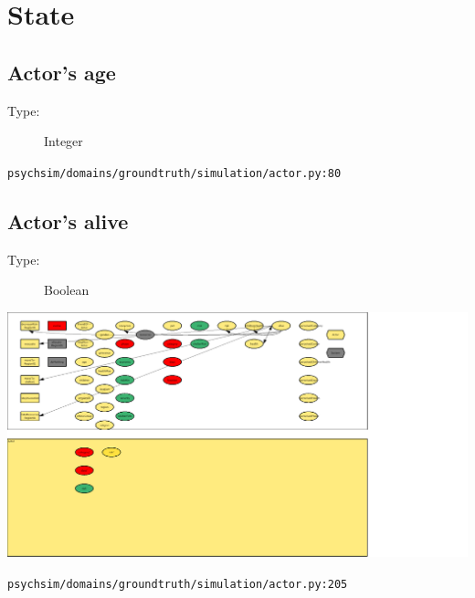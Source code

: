 \documentclass{article}%
\begin{document}
%
\section{State}%
\label{sec:State}%
\subsection{Actor's age}%
\label{subsec:Actor's age}%
\begin{description}%
\item[Type:]%
Integer%
\end{description}%
\begin{flushleft}%
\verb|psychsim/domains/groundtruth/simulation/actor.py:80|%
\end{flushleft}

%
\subsection{Actor's alive}%
\label{subsec:Actor's alive}%
\begin{description}%
\item[Type:]%
Boolean%
\end{description}%
\includegraphics[width=\textwidth]{images/aliveOfActor.png}%
\begin{flushleft}%
\verb|psychsim/domains/groundtruth/simulation/actor.py:205|%
\end{flushleft}%
\end{document}
